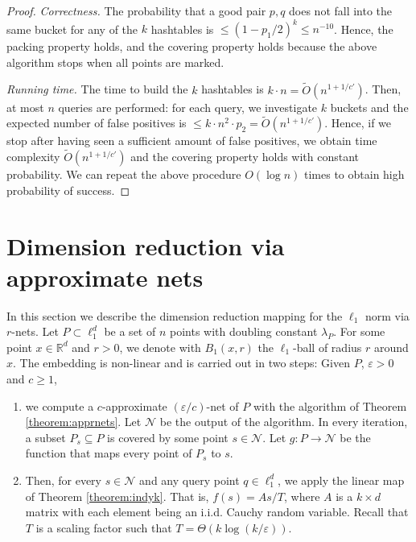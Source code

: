 \documentclass[10pt,a4paper,twoside]{book}
\newcommand{\rd}{\mathbb{R}^{d}}
\newcommand{\eps}{\varepsilon}
\newcommand{\net}{\mathcal{N}}
\theoremstyle{definition}
\theoremstyle{remark}
\begin{document}
\begin{proof}
\textit{Correctness.} The probability that a good pair $p,q$ does not fall into the same bucket for any of the $k$ hashtables is $\leq \left(1-p_1/2\right)^k \leq n^{-10}$. Hence, the packing property holds, and the covering property holds because the above algorithm stops when all points are marked. 

\textit{Running time.} The time to build the $k$ hashtables is $k\cdot n =\tilde{O}(n^{1+1/c'})$. Then, at most $n$ queries are performed: for each query, we investigate $k$ buckets and the expected number of false positives is $\leq k\cdot n^2 \cdot p_2=\tilde{O}(n^{1+1/c'})$. Hence, if we stop after having seen a sufficient amount of false positives, we obtain time complexity $\tilde{O}(n^{1+1/c'})$ and the covering property holds with constant probability. We can repeat the above procedure $O(\log n)$ times to obtain high probability of success. 
\end{proof}

\section{Dimension reduction via approximate nets}
In this section we describe the dimension reduction mapping for the $\ell_1$ norm via $r$-nets. Let $P\subset \ell_1^d$ be a set of $n$ points with doubling constant $\lambda_P$. For some point $x \in \rd$ and $r>0$, we denote with $B_1(x,r)$ the $\ell_1$-ball of radius $r$ around $x$. The embedding is non-linear and is carried out in two steps: Given $P$, $\eps >0$ and $c \geq 1$,

\begin{enumerate} \itemsep0em
    \item we compute a $c$-approximate $(\eps/c)$-net of $P$ with the algorithm of Theorem \ref{theorem:apprnets}. Let $\net$ be the output of the algorithm. In every iteration, a subset $P_s \subseteq P$ is covered by some point $s \in \net$. Let $g: P \rightarrow \net$ be the function that maps every point of $P_s$ to $s$.
    
    \item Then, for every $s \in \mathcal{N}$ and any query point $q \in \ell_1^d$, we apply the linear map of Theorem \ref{theorem:indyk}. That is,  $f(s) = As/T$, where $A$ is a $k{\times}d$ matrix with each element being an i.i.d. Cauchy random variable. Recall that $T$ is a scaling factor such that $T = \Theta(k \log {(k/ \eps)})$.
\end{enumerate}
\end{document}

